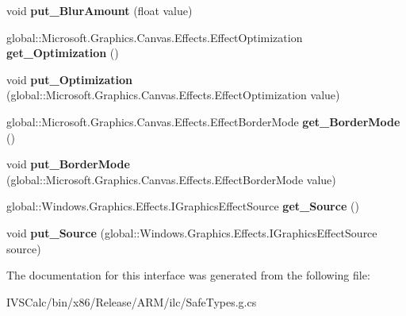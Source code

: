 \begin{DoxyCompactItemize}
\item 
\mbox{\label{interface_microsoft_1_1_graphics_1_1_canvas_1_1_effects_1_1_i_gaussian_blur_effect_a977d2c3c0ddaac5ffbbedae24b0a0770}} 
void {\bfseries put\+\_\+\+Blur\+Amount} (float value)
\item 
\mbox{\label{interface_microsoft_1_1_graphics_1_1_canvas_1_1_effects_1_1_i_gaussian_blur_effect_a2d4f490b0296608bf9c8cd9d42125733}} 
global\+::\+Microsoft.\+Graphics.\+Canvas.\+Effects.\+Effect\+Optimization {\bfseries get\+\_\+\+Optimization} ()
\item 
\mbox{\label{interface_microsoft_1_1_graphics_1_1_canvas_1_1_effects_1_1_i_gaussian_blur_effect_a9ea1c87990030f61d07b28648580ea03}} 
void {\bfseries put\+\_\+\+Optimization} (global\+::\+Microsoft.\+Graphics.\+Canvas.\+Effects.\+Effect\+Optimization value)
\item 
\mbox{\label{interface_microsoft_1_1_graphics_1_1_canvas_1_1_effects_1_1_i_gaussian_blur_effect_a9070edd9d76886803e481852cc79fe7a}} 
global\+::\+Microsoft.\+Graphics.\+Canvas.\+Effects.\+Effect\+Border\+Mode {\bfseries get\+\_\+\+Border\+Mode} ()
\item 
\mbox{\label{interface_microsoft_1_1_graphics_1_1_canvas_1_1_effects_1_1_i_gaussian_blur_effect_a206e8f9a37a96c96af289283beac798d}} 
void {\bfseries put\+\_\+\+Border\+Mode} (global\+::\+Microsoft.\+Graphics.\+Canvas.\+Effects.\+Effect\+Border\+Mode value)
\item 
\mbox{\label{interface_microsoft_1_1_graphics_1_1_canvas_1_1_effects_1_1_i_gaussian_blur_effect_a843c2c9b086f2e10542ae9aa2b39a3f6}} 
global\+::\+Windows.\+Graphics.\+Effects.\+I\+Graphics\+Effect\+Source {\bfseries get\+\_\+\+Source} ()
\item 
\mbox{\label{interface_microsoft_1_1_graphics_1_1_canvas_1_1_effects_1_1_i_gaussian_blur_effect_a366b87bbdd12c4d7eeb1c50ae1c56d3d}} 
void {\bfseries put\+\_\+\+Source} (global\+::\+Windows.\+Graphics.\+Effects.\+I\+Graphics\+Effect\+Source source)
\end{DoxyCompactItemize}


The documentation for this interface was generated from the following file\+:\begin{DoxyCompactItemize}
\item 
I\+V\+S\+Calc/bin/x86/\+Release/\+A\+R\+M/ilc/Safe\+Types.\+g.\+cs\end{DoxyCompactItemize}
